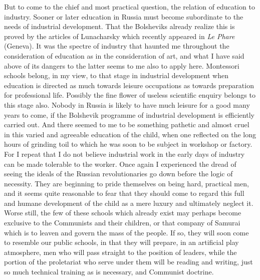But to come to the chief and most practical question, the relation of education to industry. Sooner or later education in Russia must become subordinate to the needs of industrial development. That the Bolsheviks already realize this is proved by the articles of Lunacharsky which recently appeared in \emph{Le Phare} (Geneva). It was the spectre of industry that haunted me throughout the consideration of education as in the consideration of art, and what I have said above of its dangers to the latter seems to me also to apply here. Montessori schools belong, in my view, to that stage in industrial development when education is directed as much towards leisure occupations as towards preparation for professional life. Possibly the fine flower of useless scientific enquiry belongs to this stage also. Nobody in Russia is likely to have much leisure for a good many years to come, if the Bolshevik programme of industrial development is efficiently carried out. And there seemed to me to be something pathetic and almost cruel in this varied and agreeable education of the child, when one reflected on the long hours of grinding toil to which he was soon to be subject in workshop or factory. For I repeat that I do not believe industrial work in the early days of industry can be made tolerable to the worker. Once again I experienced the dread of seeing the ideals of the Russian revolutionaries go down before the logic of necessity. They are beginning to pride themselves on being hard, practical men, and it seems quite reasonable to fear that they should come to regard this full and humane development of the child as a mere luxury and ultimately neglect it. Worse still, the few of these schools which already exist may perhaps become exclusive to the Communists and their children, or that company of Samurai which is to leaven and govern the mass of the people. If so, they will soon come to resemble our public schools, in that they will prepare, in an artificial play atmosphere, men who will pass straight to the position of leaders, while the portion of the proletariat who serve under them will be reading and writing, just so much technical training as is necessary, and Communist doctrine.

